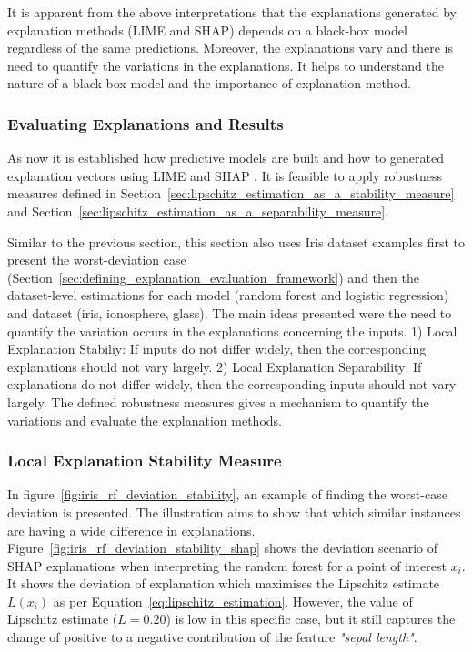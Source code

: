 \documentclass[english]{tktltiki2}
\theoremstyle{definition}
\theoremstyle{remark}
\begin{document}
It is apparent from the above interpretations that the explanations generated by explanation methods (LIME and SHAP) depends on a black-box model regardless of the same predictions. Moreover, the explanations vary and there is need to quantify the variations in the explanations. It helps to understand the nature of a black-box model and the importance of explanation method.

\subsubsection{Evaluating Explanations and Results}\label{sec:evaluating_explanations_and_results_part1}
As now it is established how predictive models are built and how to generated explanation vectors using LIME \citep{ribeiro2016should} and SHAP \citep{lundberg2017unified}. It is feasible to apply robustness measures defined in Section~\ref{sec:lipschitz_estimation_as_a_stability_measure} \citep{alvarez2018robustness} and Section~\ref{sec:lipschitz_estimation_as_a_separability_measure}.

Similar to the previous section, this section also uses Iris dataset examples first to present the worst-deviation case (Section~\ref{sec:defining_explanation_evaluation_framework}) and then the dataset-level estimations for each model (random forest and logistic regression) and dataset (iris, ionosphere, glass).
The main ideas presented were the need to quantify the variation occurs in the explanations concerning the inputs. 1) Local Explanation Stabiliy: If inputs do not differ widely, then the corresponding explanations should not vary largely. 2) Local Explanation Separability: If explanations do not differ widely, then the corresponding inputs should not vary largely. The defined robustness measures gives a mechanism to quantify the variations and evaluate the explanation methods.

\subsubsection*{Local Explanation Stability Measure}
In figure~\ref{fig:iris_rf_deviation_stability}, an example of finding the worst-case deviation is presented. The illustration aims to show that which similar instances are having a wide difference in explanations.  Figure~\ref{fig:iris_rf_deviation_stability_shap} shows the deviation scenario of SHAP explanations when interpreting the random forest for a point of interest $x_i$. It shows the deviation of explanation which maximises the Lipschitz estimate $L(x_i)$ as per Equation~\eqref{eq:lipschitz_estimation}. However, the value of Lipschitz estimate ($L=0.20$) is low in this specific case, but it still captures the change of positive to a negative contribution of the feature \textit{"sepal length"}.
\end{document}
